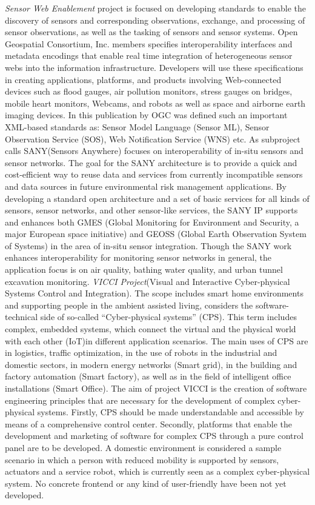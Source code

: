 \newline
	\emph{Sensor Web Enablement} project\cite{ogc} is focused on developing standards to enable the discovery of sensors and corresponding observations, exchange, and processing of sensor observations, as well as the tasking of sensors and sensor systems.
	 Open Geospatial Consortium, Inc. members specifies interoperability interfaces and metadata encodings that enable real time integration of heterogeneous sensor webs into the information infrastructure. Developers will use these specifications in creating applications, platforms, and products involving Web-connected devices such as flood gauges, air pollution monitors, stress gauges on bridges, mobile heart monitors, Webcams, and robots as well as space and airborne earth imaging devices. In this publication by OGC was defined such an important XML-based standards as: Sensor Model Language (Sensor ML), Sensor Observation Service (SOS), Web Notification Service (WNS) etc. As subproject calls SANY(Sensors Anywhere) focuses on interoperability of in-situ sensors and sensor networks. The goal for the SANY architecture is to provide a quick and cost-efficient way to reuse data and services from currently incompatible sensors and data sources in future environmental risk management applications. By developing a standard open architecture and a set of basic services for all kinds of sensors, sensor networks, and other sensor-like services, the SANY IP supports and enhances both GMES (Global Monitoring for Environment and Security, a major European space initiative) and GEOSS (Global Earth Observation System of Systems) in the area of in-situ sensor integration. Though the SANY work enhances interoperability for monitoring sensor networks in general, the application focus is on air quality, bathing water quality, and urban tunnel excavation monitoring.
\newline 
    \emph{VICCI Project}(Visual and Interactive Cyber-physical Systems Control and Integration)\cite{vicci,6548811}. The scope includes smart home environments and supporting people in the ambient assisted living, considers the software-technical side of so-called “Cyber-physical systems” (CPS). This term includes complex, embedded systems, which connect the virtual and the physical world with each other (IoT)in different application scenarios. The main uses of CPS are in logistics, traffic optimization, in the use of robots in the industrial and domestic sectors, in modern energy networks (Smart grid), in the building and factory automation (Smart factory), as well as in the field of intelligent office installations (Smart Office). The aim of project VICCI is the creation of software engineering principles that are necessary for the development of complex cyber-physical systems. Firstly, CPS should be made understandable and accessible by means of a comprehensive control center. Secondly, platforms that enable the development and marketing of software for complex CPS through a pure control panel are to be developed. A domestic environment is considered a sample scenario in which a person with reduced mobility is supported by sensors, actuators and a service robot, which is currently seen as a complex cyber-physical system. No concrete frontend or any kind of user-friendly have been not yet developed. 
